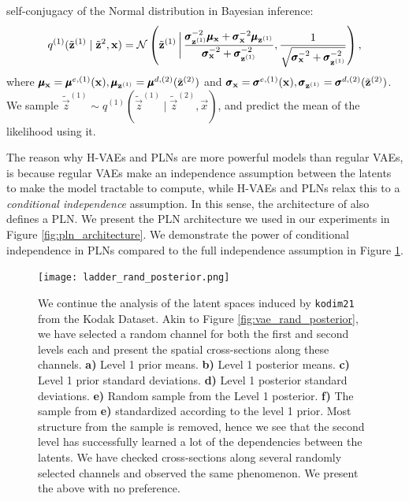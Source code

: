 self-conjugacy of the Normal distribution in Bayesian inference\footnotemark:
\[
  q^{(1)}(\tilde{\mathbf{z}}^{(1)} \mid \tilde{\mathbf{z}}^{2}, \mathbf{x}) =
  \mathcal{N}\left( \tilde{\mathbf{z}}^{(1)} \,\bigg|\,
    \frac{\pmb{\sigma}_{\mathbf{z}^{(1)}}^{-2} \pmb{\mu}_{\mathbf{x}} + \pmb{\sigma}_{\mathbf{x}}^{-2}
      \pmb{\mu}_{\mathbf{z}^{(1)}}}{\pmb{\sigma}_{\mathbf{x}}^{-2} + \pmb{\sigma}_{\mathbf{z}^{(1)}}^{-2}
    },
  \frac{1}{\sqrt{\pmb{\sigma}_{\mathbf{x}}^{-2} + \pmb{\sigma}_{\mathbf{z}^{(1)}}^{-2} }} \right),
\]
where $\pmb{\mu}_{\mathbf{x}} = \pmb{\mu}^{e, (1)}(\mathbf{x}), \pmb{\mu}_{\mathbf{z}^{(1)}} = \pmb{\mu}^{d, (2)}(\tilde{\mathbf{z}}^{(2)})$
and $\pmb{\sigma}_{\mathbf{x}} = \pmb{\sigma}^{e, (1)}(\mathbf{x}), \pmb{\sigma}_{\mathbf{z}^{(1)}} = \pmb{\sigma}^{d, (2)}(\tilde{\mathbf{z}}^{(2)})$.
We sample $\tilde{\vec{z}}^{(1)} \sim q^{(1)}(\tilde{\vec{z}}^{(1)} \mid
\tilde{\vec{z}}^{(2)}, \vec{x})$, and predict the mean of the likelihood using it.
\par 
The reason why H-VAEs and PLNs are more powerful models than regular VAEs, is
because regular VAEs make an independence assumption between the latents to make
the model tractable to compute, while H-VAEs and PLNs relax this to a
\textit{conditional independence} assumption. In this sense, the architecture of 
\cite{balle2018variational} also defines a PLN. We present the PLN architecture
we used in our experiments in Figure \ref{fig:pln_architecture}. We demonstrate
the power of conditional independence in PLNs compared to the full independence
assumption in Figure \ref{fig:ladder_rand_posterior}.


\begin{figure}
  \centering
  \texttt{[image: ladder\_rand\_posterior.png]}
  \caption[Latent spaces induced by \texttt{kodim21} in our PLN]
  {We continue the analysis of the latent spaces induced by
    \texttt{kodim21} from the Kodak Dataset. Akin to Figure
    \ref{fig:vae_rand_posterior}, we have selected a random channel for both the
    first and second levels each and present the spatial cross-sections along these
    channels. \textbf{a)} Level 1 prior means. \textbf{b)} Level 1 posterior means.
    \textbf{c)} Level 1 prior standard deviations. \textbf{d)} Level 1 posterior
    standard deviations. \textbf{e)} Random sample from the Level 1 posterior.
    \textbf{f)} The sample from \textbf{e)} standardized according to the level
    1 prior. Most structure from the sample is removed, hence we see that the
    second level has successfully learned a lot of the dependencies between the
    latents. We have checked cross-sections along several randomly selected
    channels and observed the same phenomenon. We present the above with no preference.}
  \label{fig:ladder_rand_posterior}
\end{figure}

